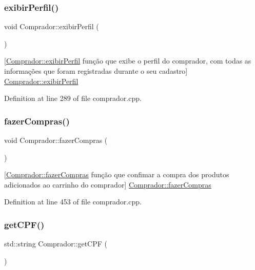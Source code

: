 \subsubsection{\texorpdfstring{exibir\+Perfil()}{exibirPerfil()}}
{\footnotesize\ttfamily void Comprador\+::exibir\+Perfil (\begin{DoxyParamCaption}{ }\end{DoxyParamCaption})}

\mbox{[}\hyperlink{class_comprador_a35d18c3bcfff0adfe8dd3b75f46f8bd8}{Comprador\+::exibir\+Perfil} função que exibe o perfil do comprador, com todas as informações que foram registradas durante o seu cadastro\mbox{]}  \hyperlink{class_comprador_a35d18c3bcfff0adfe8dd3b75f46f8bd8}{Comprador\+::exibir\+Perfil} 

Definition at line 289 of file comprador.\+cpp.

\mbox{\label{class_comprador_a93794d8122ae9f09f192af5d0c027527}} 
\subsubsection{\texorpdfstring{fazer\+Compras()}{fazerCompras()}}
{\footnotesize\ttfamily void Comprador\+::fazer\+Compras (\begin{DoxyParamCaption}{ }\end{DoxyParamCaption})}

\mbox{[}\hyperlink{class_comprador_a93794d8122ae9f09f192af5d0c027527}{Comprador\+::fazer\+Compras} função que confimar a compra dos produtos adicionados ao carrinho do comprador\mbox{]}  \hyperlink{class_comprador_a93794d8122ae9f09f192af5d0c027527}{Comprador\+::fazer\+Compras} 

Definition at line 453 of file comprador.\+cpp.

\mbox{\label{class_comprador_aeb955f1d7fb934cc4e5ffe85d1f5b1f1}} 
\subsubsection{\texorpdfstring{get\+C\+P\+F()}{getCPF()}}
{\footnotesize\ttfamily std\+::string Comprador\+::get\+C\+PF (\begin{DoxyParamCaption}{ }\end{DoxyParamCaption})}

